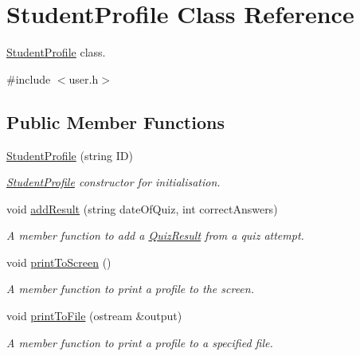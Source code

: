 \hypertarget{class_student_profile}{}\section{Student\+Profile Class Reference}
\label{class_student_profile}


\hyperlink{class_student_profile}{Student\+Profile} class.  




{\ttfamily \#include $<$user.\+h$>$}

\subsection*{Public Member Functions}
\begin{DoxyCompactItemize}
\item 
\hyperlink{class_student_profile_adff542cb5595ba22e7d0f43475610ef3}{Student\+Profile} (string I\+D)
\begin{DoxyCompactList}\small\item\em \hyperlink{class_student_profile}{Student\+Profile} constructor for initialisation. \end{DoxyCompactList}\item 
void \hyperlink{class_student_profile_a52410e28b23a48921163e62689212d0c}{add\+Result} (string date\+Of\+Quiz, int correct\+Answers)
\begin{DoxyCompactList}\small\item\em A member function to add a \hyperlink{class_quiz_result}{Quiz\+Result} from a quiz attempt. \end{DoxyCompactList}\item 
void \hyperlink{class_student_profile_af2d8e1bbc6f054544607ec7d264c88a4}{print\+To\+Screen} ()
\begin{DoxyCompactList}\small\item\em A member function to print a profile to the screen. \end{DoxyCompactList}\item 
void \hyperlink{class_student_profile_a53043210f40c1b2dea4a0c43eb9dcd58}{print\+To\+File} (ostream \&output)
\begin{DoxyCompactList}\small\item\em A member function to print a profile to a specified file. \end{DoxyCompactList}\end{DoxyCompactItemize}
